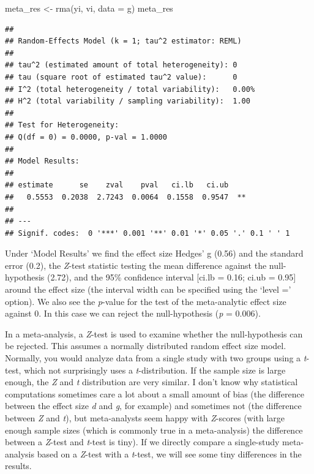 \documentclass[
  oneside]{book}
\newenvironment{Shaded}{\begin{snugshade}}{\end{snugshade}}
\newcommand{\AttributeTok}[1]{\textcolor[rgb]{0.77,0.63,0.00}{#1}}
\newcommand{\FunctionTok}[1]{\textcolor[rgb]{0.00,0.00,0.00}{#1}}
\newcommand{\NormalTok}[1]{#1}
\newcommand{\OtherTok}[1]{\textcolor[rgb]{0.56,0.35,0.01}{#1}}
\begin{document}
\begin{Shaded}
\begin{Highlighting}[]
\NormalTok{meta\_res }\OtherTok{\textless{}{-}} \FunctionTok{rma}\NormalTok{(yi, vi, }\AttributeTok{data =}\NormalTok{ g)}
\NormalTok{meta\_res}
\end{Highlighting}
\end{Shaded}

\begin{verbatim}
## 
## Random-Effects Model (k = 1; tau^2 estimator: REML)
## 
## tau^2 (estimated amount of total heterogeneity): 0
## tau (square root of estimated tau^2 value):      0
## I^2 (total heterogeneity / total variability):   0.00%
## H^2 (total variability / sampling variability):  1.00
## 
## Test for Heterogeneity:
## Q(df = 0) = 0.0000, p-val = 1.0000
## 
## Model Results:
## 
## estimate      se    zval    pval   ci.lb   ci.ub 
##   0.5553  0.2038  2.7243  0.0064  0.1558  0.9547  ** 
## 
## ---
## Signif. codes:  0 '***' 0.001 '**' 0.01 '*' 0.05 '.' 0.1 ' ' 1
\end{verbatim}

Under `Model Results' we find the effect size Hedges' g (0.56) and the standard error (0.2), the \emph{Z}-test statistic testing the mean difference against the null-hypothesis (2.72), and the 95\% confidence interval {[}ci.lb = 0.16; ci.ub = 0.95{]} around the effect size (the interval width can be specified using the `level =' option). We also see the \emph{p}-value for the test of the meta-analytic effect size against 0. In this case we can reject the null-hypothesis (\emph{p} = 0.006).

In a meta-analysis, a \emph{Z}-test is used to examine whether the null-hypothesis can be rejected. This assumes a normally distributed random effect size model. Normally, you would analyze data from a single study with two groups using a \emph{t}-test, which not surprisingly uses a \emph{t}-distribution. If the sample size is large enough, the \emph{Z} and \emph{t} distribution are very similar. I don't know why statistical computations sometimes care a lot about a small amount of bias (the difference between the effect size \emph{d} and \emph{g}, for example) and sometimes not (the difference between \emph{Z} and \emph{t}), but meta-analysts seem happy with \emph{Z}-scores (with large enough sample sizes (which is commonly true in a meta-analysis) the difference between a \emph{Z}-test and \emph{t}-test is tiny). If we directly compare a single-study meta-analysis based on a \emph{Z}-test with a \emph{t}-test, we will see some tiny differences in the results.
\end{document}
